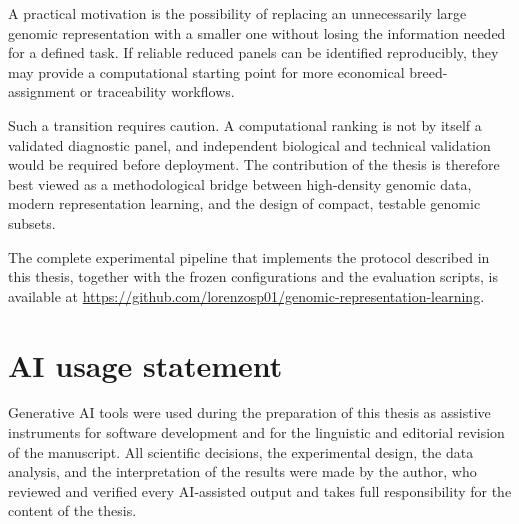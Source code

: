 A practical motivation is the possibility of replacing an
unnecessarily large genomic representation with a smaller one without
losing the information needed for a defined task. If reliable
reduced panels can be identified reproducibly, they may provide a
computational starting point for more economical breed-assignment or
traceability workflows.

Such a transition requires caution. A computational ranking is not by
itself a validated diagnostic panel, and independent biological and
technical validation would be required before deployment. The
contribution of the thesis is therefore best viewed as a
methodological bridge between high-density genomic data, modern
representation learning, and the design of compact, testable genomic
subsets.

The complete experimental pipeline that implements the protocol
described in this thesis, together with the frozen configurations and
the evaluation scripts, is available at
\url{https://github.com/lorenzosp01/genomic-representation-learning}.

\section*{AI usage statement}

Generative AI tools were used during the preparation of this thesis as
assistive instruments for software development and for the linguistic
and editorial revision of the manuscript. All scientific decisions,
the experimental design, the data analysis, and the interpretation of
the results were made by the author, who reviewed and verified every
AI-assisted output and takes full responsibility for the content of
the thesis.
